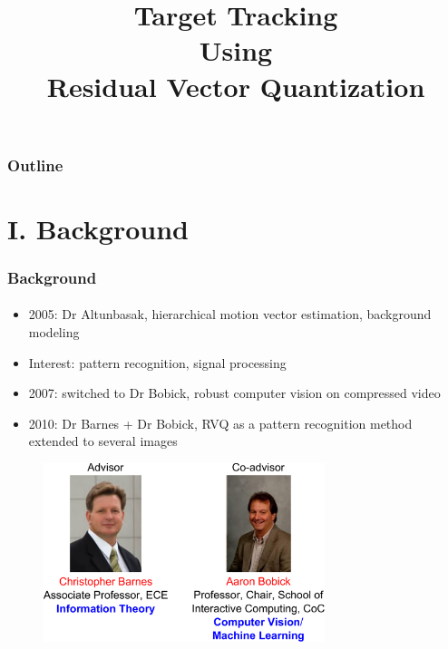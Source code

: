 

\title{Target Tracking \\ Using \\Residual Vector Quantization}
\begin{frame}[plain]\logoCSIPCPL\logoTechTower
	\titlepage
\end{frame}

\begin{frame}
\frametitle{Outline}
\logoCSIPCPL\logoTechTower
	\setcounter{tocdepth}{1}	
	\tableofcontents
\end{frame}

\section{I. Background}
\begin{frame}
\frametitle{Background}
\framesubtitle{}
\logoCSIPCPL\mypagenum
\vspace{0.2in}
\begin{itemize}
\item 2005: Dr Altunbasak, hierarchical motion vector estimation, background modeling
\item {\color{blue}Interest}: pattern recognition, signal processing
\item 2007: switched to Dr Bobick, robust computer vision on compressed video
\item 2010: Dr Barnes + Dr Bobick, RVQ as a pattern recognition method extended to several images
\end{itemize}
\begin{figure}
\includegraphics[width=0.73\textwidth]{thesis/professors.pdf}
\end{figure}
\end{frame}

